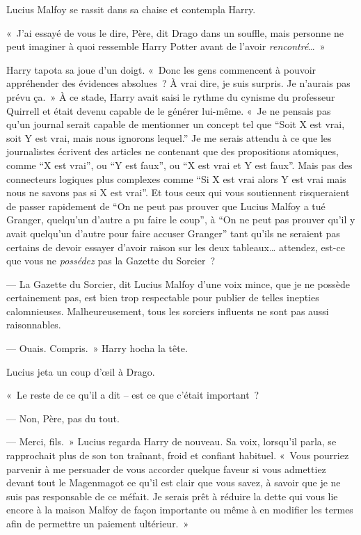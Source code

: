 Lucius Malfoy se rassit dans sa chaise et contempla Harry.

«~J'ai essayé de vous le dire, Père, dit Drago dans un souffle, mais personne ne peut imaginer à quoi ressemble Harry Potter avant de l'avoir \emph{rencontré}…~»

Harry tapota sa joue d'un doigt. «~Donc les gens commencent à pouvoir appréhender des évidences absolues~? À vrai dire, je suis surpris. Je n'aurais pas prévu ça.~» À ce stade, Harry avait saisi le rythme du cynisme du professeur Quirrell et était devenu capable de le générer lui-même. «~Je ne pensais pas qu'un journal serait capable de mentionner un concept tel que “Soit X est vrai, soit Y est vrai, mais nous ignorons lequel.” Je me serais attendu à ce que les journalistes écrivent des articles ne contenant que des propositions atomiques, comme “X est vrai”, ou “Y est faux”, ou “X est vrai et Y est faux”. Mais pas des connecteurs logiques plus complexes comme “Si X est vrai alors Y est vrai mais nous ne savons pas si X est vrai”. Et tous ceux qui vous soutiennent risqueraient de passer rapidement de “On ne peut pas prouver que Lucius Malfoy a tué Granger, quelqu'un d'autre a pu faire le coup”, à “On ne peut pas prouver qu'il y avait quelqu'un d'autre pour faire accuser Granger” tant qu'ils ne seraient pas certains de devoir essayer d'avoir raison sur les deux tableaux… attendez, est-ce que vous ne \emph{possédez} pas la Gazette du Sorcier~?

--- La Gazette du Sorcier, dit Lucius Malfoy d'une voix mince, que je ne possède certainement pas, est bien trop respectable pour publier de telles inepties calomnieuses. Malheureusement, tous les sorciers influents ne sont pas aussi raisonnables.

--- Ouais. Compris.~» Harry hocha la tête.

Lucius jeta un coup d'œil à Drago.

«~Le reste de ce qu'il a dit -- est ce que c'était important~?

--- Non, Père, pas du tout.

--- Merci, fils.~» Lucius regarda Harry de nouveau. Sa voix, lorsqu'il parla, se rapprochait plus de son ton traînant, froid et confiant habituel. «~Vous pourriez parvenir à me persuader de vous accorder quelque faveur si vous admettiez devant tout le Magenmagot ce qu'il est clair que vous savez, à savoir que je ne suis pas responsable de ce méfait. Je serais prêt à réduire la dette qui vous lie encore à la maison Malfoy de façon importante ou même à en modifier les termes afin de permettre un paiement ultérieur.~»

